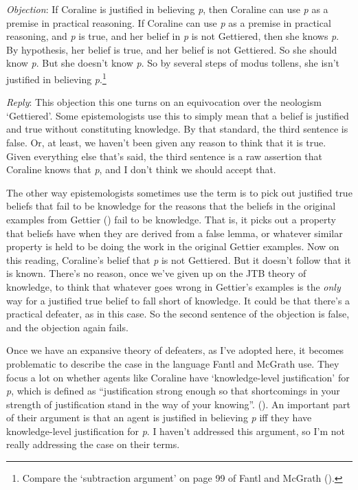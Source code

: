 \documentclass[
  10pt,
  letterpaper,
  DIV=11,
  numbers=noendperiod,
  twoside]{scrartcl}
\begin{document}
\emph{Objection}: If Coraline is justified in believing \emph{p}, then
Coraline can use \emph{p} as a premise in practical reasoning. If
Coraline can use \emph{p} as a premise in practical reasoning, and
\emph{p} is true, and her belief in \emph{p} is not Gettiered, then she
knows \emph{p}. By hypothesis, her belief is true, and her belief is not
Gettiered. So she should know \emph{p}. But she doesn't know \emph{p}.
So by several steps of modus tollens, she isn't justified in believing
\emph{p}.\footnote{Compare the `subtraction argument' on page 99 of
  Fantl and McGrath ().}

\emph{Reply}: This objection this one turns on an equivocation over the
neologism `Gettiered'. Some epistemologists use this to simply mean that
a belief is justified and true without constituting knowledge. By that
standard, the third sentence is false. Or, at least, we haven't been
given any reason to think that it is true. Given everything else that's
said, the third sentence is a raw assertion that Coraline knows that
\emph{p}, and I don't think we should accept that.

The other way epistemologists sometimes use the term is to pick out
justified true beliefs that fail to be knowledge for the reasons that
the beliefs in the original examples from Gettier
() fail to be knowledge. That is, it
picks out a property that beliefs have when they are derived from a
false lemma, or whatever similar property is held to be doing the work
in the original Gettier examples. Now on this reading, Coraline's belief
that \emph{p} is not Gettiered. But it doesn't follow that it is known.
There's no reason, once we've given up on the JTB theory of knowledge,
to think that whatever goes wrong in Gettier's examples is the
\emph{only} way for a justified true belief to fall short of knowledge.
It could be that there's a practical defeater, as in this case. So the
second sentence of the objection is false, and the objection again
fails.

Once we have an expansive theory of defeaters, as I've adopted here, it
becomes problematic to describe the case in the language Fantl and
McGrath use. They focus a lot on whether agents like Coraline have
`knowledge-level justification' for \emph{p}, which is defined as
``justification strong enough so that shortcomings in your strength of
justification stand in the way of your knowing''.
(). An
important part of their argument is that an agent is justified in
believing \emph{p} iff they have knowledge-level justification for
\emph{p}. I haven't addressed this argument, so I'm not really
addressing the case on their terms.
\end{document}
